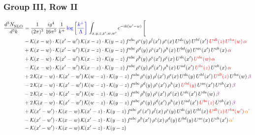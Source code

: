 \documentclass[9pt]{article}
\numberwithin{equation}{section}
\begin{document}
\subsubsection{Group III, Row II}
\begin{align}
     \frac{d^{3}N_{\rm NLO}^{\rm}}{d^{3}k}  & = \frac{1}{(2\pi)^{3}}\, \frac{ig^{4}}{16\pi^{5}}\, \frac{1}{k^{+}}\, {\color{blue}\log{\left[\frac{k^{+}}{\Lambda}\right]}}\,\int_{x,y,z,x^{\prime},w,w^{\prime}}e^{-ik(w^{\prime}-w)}\, \Bigg[\notag \\ & -\mathcal{K}(x-w)\cdot \mathcal{K}(x'-w')\, \mathcal{K}(x-z)\cdot \mathcal{K}(y-z)\, f^{abc}\, \rho^{e}(y)\,\rho^{l}(x')\,\rho^{c}(x)\,U^{de}(y)\,U^{hl}(x')\,{\color{red}U^{db}(z)}\,{\color{red}U^{ha}(w)}\, {\color{red}\alpha} \notag \\ & +\mathcal{K}(x-w)\cdot \mathcal{K}(x'-w')\, \mathcal{K}(x-z)\cdot \mathcal{K}(y-z)\, f^{abc}\, \rho^{d}(y)\,\rho^{e}(x')\,\rho^{h}(x)\,U^{bd}(y)\,U^{ae}(x')\,U^{ch}(x)\, {\color{red}\alpha} \notag \\ & + \mathcal{K}(x-w)\cdot \mathcal{K}(x'-w')\, \mathcal{K}(x-z)\cdot \mathcal{K}(y-z)\, f^{abc}\, \rho^{b}(y)\,\rho^{e}(x')\,\rho^{c}(x)\,U^{de}(x')\,{\color{red}U^{da}(w)}\, {\color{red}\alpha} \notag \\ & -\mathcal{K}(x-w)\cdot \mathcal{K}(x'-w')\, \mathcal{K}(x-z)\cdot \mathcal{K}(y-z)\, f^{abc}\, \rho^{e}(y)\,\rho^{d}(x')\,\rho^{h}(x)\,U^{ad}(x')\,{\color{red}U^{be}(z)}\,U^{ch}(x)\, {\color{red}\alpha} \notag \\ & +2\, \mathcal{K}(x-w)\cdot \mathcal{K}(x'-w')\, \mathcal{K}(w-z) \cdot \mathcal{K}(y-z)\, f^{abc}\, \rho^{e}(y)\,\rho^{l}(x')\, \rho^{c}(x)\, U^{de}(y)\,U^{hl}(x')\,{\color{red}U^{db}(z)}\,U^{ha}(w)\, {\color{violet} \beta} \notag \\ & -2\, \mathcal{K}(x-w)\cdot \mathcal{K}(x'-w')\, \mathcal{K}(w-z) \cdot \mathcal{K}(y-z)\, f^{abc}\, \rho^{d}(y)\,\rho^{e}(x')\, \rho^{h}(x)\, {\color{red}U^{bd}(y)}\,U^{ae}(x')\,U^{ch}(x)\, {\color{violet} \beta}\notag \\ & -2\, \mathcal{K}(x-w)\cdot \mathcal{K}(x'-w')\, \mathcal{K}(w-z) \cdot \mathcal{K}(y-z)\, f^{abc}\, \rho^{b}(y)\,\rho^{e}(x')\, \rho^{c}(x)\, U^{de}(x')\,U^{da}(w)\, {\color{violet} \beta}\notag \\ & + 2\, \mathcal{K}(x-w)\cdot \mathcal{K}(x'-w')\, \mathcal{K}(w-z) \cdot \mathcal{K}(y-z)\, f^{abc}\, \rho^{e}(y)\,\rho^{d}(x')\, \rho^{h}(x)\, U^{ad}(x')\,{\color{red}U^{be}(z)}\,U^{ch}(x)\, {\color{violet} \beta}\notag \\ & +\mathcal{K}(x'-w')\cdot\mathcal{K}(x-w)\,\mathcal{K}(x'-z)\cdot\mathcal{K}(y-z)\, f^{abc}\,\rho^{c}(x')\,\rho^{l}(x)\,\rho^{e}(y)\,U^{de}(y)\,U^{hl}(x)\,{\color{red}U^{db}(z)}\,{\color{red}U^{ha}(w')}\,{\color{orange} \alpha'}\notag\\ & -\mathcal{K}(x'-w')\cdot\mathcal{K}(x-w)\,\mathcal{K}(x'-z)\cdot\mathcal{K}(y-z)\, f^{abc}\,\rho^{h}(x')\,\rho^{e}(x)\,\rho^{d}(y)\,U^{bd}(y)\,U^{ae}(x)\,U^{ch}(x')\,{\color{orange} \alpha'}\notag\\ &-\mathcal{K}(x'-w')\cdot\mathcal{K}(x-w)\,\mathcal{K}(x'-z)\cdot\mathcal{K}(y-z)\, 
\end{align}
\end{document}
